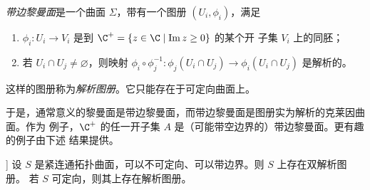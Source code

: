 \emph{带边黎曼面}是一个曲面 $\Sigma$，带有一个图册 $(U_i,\phi_i)$，满足
\begin{enumerate}[label=(\roman*), start=3, leftmargin=2.2em, itemsep=0.15em]
\item $\phi_i:U_i\to V_i$ 是到 $\C^+=\{z\in\C\mid\operatorname{Im}z\ge0\}$ 的某个开
      子集 $V_i$ 上的同胚；
\item 若 $U_i\cap U_j\neq\varnothing$，则映射
      $\phi_i\circ\phi_j^{-1}:\phi_j(U_i\cap U_j)\to\phi_i(U_i\cap U_j)$ 是解析的。
\end{enumerate}
这样的图册称为\emph{解析图册}。它只能存在于可定向曲面上。

于是，通常意义的黎曼面是带边黎曼面，而带边黎曼面是图册实为解析的克莱因曲面。作为
例子，$\C^+$ 的任一开子集 $A$ 是（可能带空边界的）带边黎曼面。更有趣的例子由下述
结果提供。

\begin{theorem}[Alling 与 Greenleaf, [1]]\label{thm:2.1.13}
设 $S$ 是紧连通拓扑曲面，可以不可定向、可以带边界。则 $S$ 上存在双解析图册。
若 $S$ 可定向，则其上存在解析图册。
\end{theorem}
